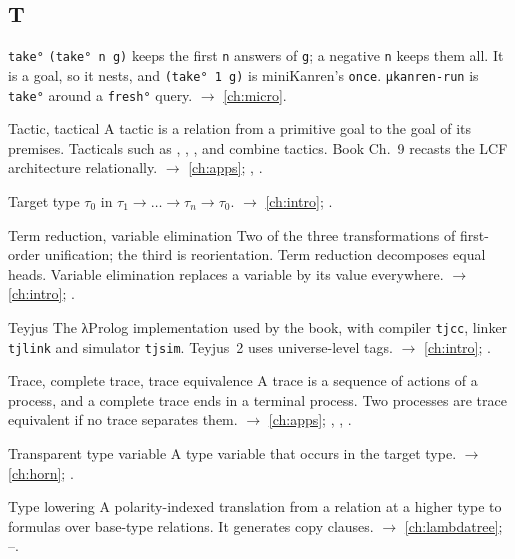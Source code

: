 \subsection*{T}
\begin{glossarylist}
\item[\texttt{take°}] \texttt{(take° n g)} keeps the first \texttt{n} answers of \texttt{g}; a negative
  \texttt{n} keeps them all. It is a goal, so it nests, and \texttt{(take° 1 g)} is miniKanren's \texttt{once}.
  \texttt{μkanren-run} is \texttt{take°} around a \texttt{fresh°} query. $\rightarrow$ \cref{ch:micro}.
\item[Tactic, tactical] A tactic is a relation  from a primitive goal to the goal of its
  premises. Tacticals such as , , ,  and  combine tactics. Book
  Ch.~9 recasts the LCF architecture relationally. $\rightarrow$ \cref{ch:apps}; , .
\item[Target type] $\tau_0$ in $\tau_1\to\dots\to\tau_n\to\tau_0$. $\rightarrow$ \cref{ch:intro}; .
\item[Term reduction, variable elimination] Two of the three transformations of first-order unification; the third
  is reorientation. Term reduction decomposes equal heads. Variable elimination replaces a variable by its value
  everywhere. $\rightarrow$ \cref{ch:intro}; .
\item[Teyjus] The λProlog implementation used by the book, with compiler \texttt{tjcc}, linker \texttt{tjlink} and
  simulator \texttt{tjsim}. Teyjus~2 uses universe-level tags. $\rightarrow$ \cref{ch:intro}; .
\item[Trace, complete trace, trace equivalence] A trace is a sequence of actions of a process, and a complete trace
  ends in a terminal process. Two processes are trace equivalent if no trace separates them.
  $\rightarrow$ \cref{ch:apps}; , , .
\item[Transparent type variable] A type variable that occurs in the target type. $\rightarrow$ \cref{ch:horn};
  .
\item[Type lowering] A polarity-indexed translation from a relation at a higher type to formulas over base-type
  relations. It generates copy clauses. $\rightarrow$ \cref{ch:lambdatree}; --.
\end{glossarylist}

